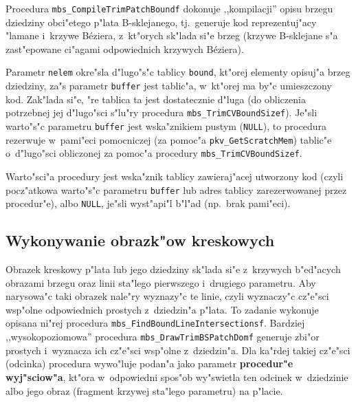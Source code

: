 \vspace{\bigskipamount}
Procedura \texttt{mbs\_CompileTrimPatchBoundf} dokonuje ,,kompilacji'' opisu
brzegu dziedziny obci"etego p"lata B-sklejanego, tj.\ generuje kod
reprezentuj"acy "lamane i~krzywe B\'{e}ziera, z~kt"orych sk"lada si"e brzeg
(krzywe B-sklejane s"a zast"epowane ci"agami odpowiednich krzywych
B\'{e}ziera).

Parametr \texttt{nelem} okre"sla d"lugo"s"c tablicy \texttt{bound}, kt"orej
elementy opisuj"a brzeg dziedziny, za"s parametr \texttt{buffer} jest
tablic"a, w~kt"orej ma by"c umieszczony kod. Zak"lada si"e, "re tablica ta
jest dostatecznie d"luga (do obliczenia potrzebnej jej d"lugo"sci s"lu"ry
procedura \texttt{mbs\_TrimCVBoundSizef}). Je"sli warto"s"c parametru
\texttt{buffer} jest wska"znikiem pustym (\texttt{NULL}),
to procedura rezerwuje w~pami"eci pomocniczej (za pomoc"a
\texttt{pkv\_GetScratchMem}) tablic"e o~d"lugo"sci obliczonej
za pomoc"a procedury \texttt{mbs\_TrimCVBoundSizef}.

Warto"sci"a procedury jest wska"znik tablicy zawieraj"acej utworzony kod
(czyli pocz"atkowa warto"s"c parametru \texttt{buffer} lub adres tablicy
zarezerwowanej przez procedur"e), albo \texttt{NULL}, je"sli wyst"api"l
b"l"ad (np.\ brak pami"eci).


\subsection{Wykonywanie obrazk"ow kreskowych}

\begin{sloppypar}
Obrazek kreskowy p"lata lub jego dziedziny sk"lada si"e z~krzywych
b"ed"acych obrazami brzegu oraz linii sta"lego pierwszego i~drugiego
parametru. Aby narysowa"c taki obrazek nale"ry wyznazy"c te linie, czyli
wyznaczy"c cz"e"sci wsp"olne odpowiednich prostych z~dziedzin"a p"lata. To
zadanie wykonuje opisana ni"rej procedura
\texttt{mbs\_FindBoundLineIntersectionsf}. Bardziej ,,wysokopoziomowa''
procedura \texttt{mbs\_DrawTrimBSPatchDomf} generuje zbi"or prostych
i~wyznacza ich cz"e"sci wsp"olne z~dziedzin"a. Dla ka"rdej takiej cz"e"sci
(odcinka) procedura wywo"luje podan"a jako parametr \textbf{procedur"e
wyj"sciow"a}, kt"ora w~odpowiedni spos"ob wy"swietla ten odcinek
w~dziedzinie albo jego obraz (fragment krzywej sta"lego parametru) na
p"lacie.
\end{sloppypar}

